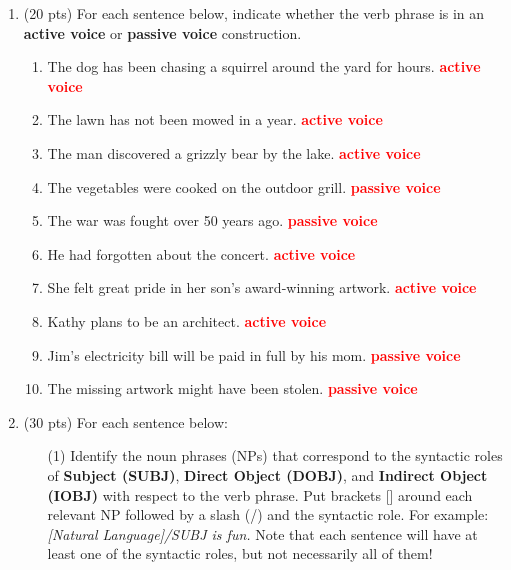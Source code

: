 \documentclass[11pt]{article}
\begin{document}
\begin{enumerate}
\newpage
\item (20 pts) For each sentence below, indicate whether the verb
  phrase is in an {\bf active voice} or {\bf passive voice}
  construction.  

\begin{enumerate}

\item The dog has been chasing a squirrel around the yard for hours. \textcolor{red}{{\bf active voice}}

\item The lawn has not been mowed in a year. \textcolor{red}{{\bf active voice}}

\item The man discovered a grizzly bear by the lake. \textcolor{red}{{\bf active voice}}

\item The vegetables were cooked on the outdoor grill. \textcolor{red}{{\bf passive voice}}

\item The war was fought over 50 years ago. \textcolor{red}{{\bf passive voice}}

\item He had forgotten about the concert. \textcolor{red}{{\bf active voice}}

\item She felt great pride in her son's award-winning artwork. \textcolor{red}{{\bf active voice}}

\item Kathy plans to be an architect. \textcolor{red}{{\bf active voice}}

\item Jim's electricity bill will be paid in full by his mom. \textcolor{red}{{\bf passive voice}}

\item The missing artwork might have been stolen. \textcolor{red}{{\bf passive voice}}

\end{enumerate}



\newpage
\item (30 pts) For each sentence below: 

\begin{enumerate}
\item[(1)] Identify the noun phrases (NPs) that correspond to the syntactic roles
  of {\bf Subject (SUBJ)}, {\bf Direct Object (DOBJ)}, and {\bf
    Indirect Object (IOBJ)}
  with respect to the verb phrase.   Put brackets [] around each
  relevant NP followed by a slash (/) and the syntactic role. For
  example: {\it [Natural Language]/SUBJ is fun. }
  Note that each sentence will have at least
  one of the syntactic roles, but not necessarily all of them!


\end{enumerate}
\end{enumerate}
\end{document}
